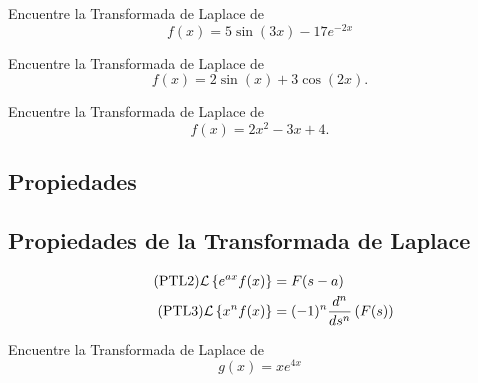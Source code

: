  \begin{problema}
  \label{bron:exmp:21.11}
  Encuentre la Transformada de Laplace de
  $$f(x)=5\sin(3x)-17e^{-2x}$$
 \end{problema}




 \begin{problema}
  \label{bron:exmp:21.12}
  Encuentre la Transformada de Laplace de
  $$f(x)=2\sin(x)+3\cos(2x).$$
 \end{problema}




 \begin{problema}
  \label{bron:exmp:21.13}
  Encuentre la Transformada de Laplace de
  $$f(x)=2x^{2}-3x+4.$$
 \end{problema}



\subsection{Propiedades}

\subsection{Propiedades de la Transformada de Laplace}
\begin{align}
  \label{bron:21.4}
  \tag{PTL2}
  \mathcal{L}\left\{ e^{ax}f(x) \right\}&=F(s-a)\\
  \label{bron:21.5}
  \tag{PTL3}
  \mathcal{L}\left\{ x^{n}f(x) \right\}&=(-1)^{n}\dfrac{d^{n}}{ds^{n}}\left( F(s) \right)
\end{align}


%
%
%
%
%
%
%
%

%
%
%


 \begin{problema}
  \label{bron:exmp:21.14}
  Encuentre la Transformada de Laplace de
  $$g(x)=xe^{4x}$$
 \end{problema}


